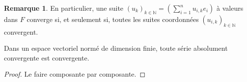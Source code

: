 \documentclass[french]{article}
\newcommand{\N}{\mathbb{N}}
\theoremstyle{plain}
\theoremstyle{definition}
\newtheorem*{rmq}{Remarque}
\theoremstyle{remark}
\begin{document}
\begin{rmq}
	En particulier, une suite $(u_k)_{k\in\N}=\displaystyle\left(\sum_{i=1}^{n}u_{i,k}e_i\right)$ à valeurs dans $F$ converge si, et seulement si, toutes les suites coordonnées $(u_{i,k})_{k\in\N}$ convergent.
\end{rmq}

\begin{thm}%
	Dans un espace vectoriel normé de dimension finie, toute série absolument convergente est convergente.
\end{thm}
\begin{proof}
	Le faire composante par composante.
\end{proof}
\end{document}
